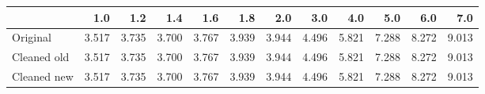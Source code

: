 \begin{tabular}{lrrrrrrrrrrr}
\toprule
{} &   1.0 &   1.2 &   1.4 &   1.6 &   1.8 &   2.0 &   3.0 &   4.0 &   5.0 &   6.0 &   7.0 \\
\midrule
Original    & 3.517 & 3.735 & 3.700 & 3.767 & 3.939 & 3.944 & 4.496 & 5.821 & 7.288 & 8.272 & 9.013 \\
Cleaned old & 3.517 & 3.735 & 3.700 & 3.767 & 3.939 & 3.944 & 4.496 & 5.821 & 7.288 & 8.272 & 9.013 \\
Cleaned new & 3.517 & 3.735 & 3.700 & 3.767 & 3.939 & 3.944 & 4.496 & 5.821 & 7.288 & 8.272 & 9.013 \\
\bottomrule
\end{tabular}
